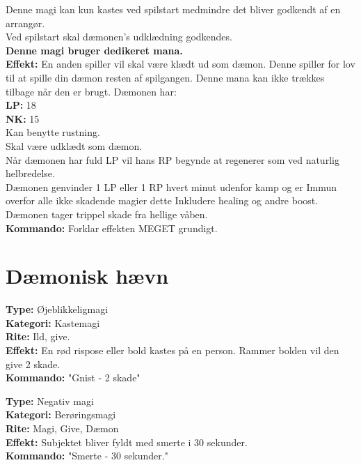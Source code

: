 \begin{sjæl*}
Denne magi kan kun kastes ved spilstart medmindre det bliver godkendt af en arrangør.\\
Ved spilstart skal dæmonen's udklædning godkendes.\\
\textbf{Denne magi bruger dedikeret mana.}\\
\textbf{Effekt:} En anden spiller vil skal være klædt ud som dæmon. Denne spiller for lov til at spille din dæmon resten af spilgangen. Denne mana kan ikke trækkes tilbage når den er brugt.
Dæmonen har:\\
\textbf{LP:} 18\\
\textbf{NK:} 15\\
Kan benytte rustning.\\
Skal være udklædt som dæmon.\\
Når dæmonen har fuld LP vil hans RP begynde at regenerer som ved naturlig helbredelse.\\ Dæmonen genvinder 1 LP eller 1 RP hvert minut udenfor kamp og er Immun overfor alle ikke skadende magier dette Inkludere healing og andre boost.\\
Dæmonen tager trippel skade fra hellige våben.\\
\textbf{Kommando:} Forklar effekten MEGET grundigt.
\end{sjæl*}

\section*{Dæmonisk hævn }

\begin{dHævn*}[Gnist]
\textbf{Type:} Øjeblikkeligmagi\\
\textbf{Kategori:} Kastemagi\\
\textbf{Rite:} Ild, give.\\
\textbf{Effekt:} En rød rispose eller bold kastes på en person. Rammer bolden vil den give 2 skade.\\
\textbf{Kommando:} "Gnist - 2 skade"
\end{dHævn*}

\begin{dHævn*}[Smerte]
\textbf{Type:} Negativ magi\\
\textbf{Kategori:} Berøringsmagi\\
\textbf{Rite:} Magi, Give, Dæmon\\
\textbf{Effekt:} Subjektet bliver fyldt med smerte i 30 sekunder.\\
\textbf{Kommando:} "Smerte - 30 sekunder."
\end{dHævn*}

